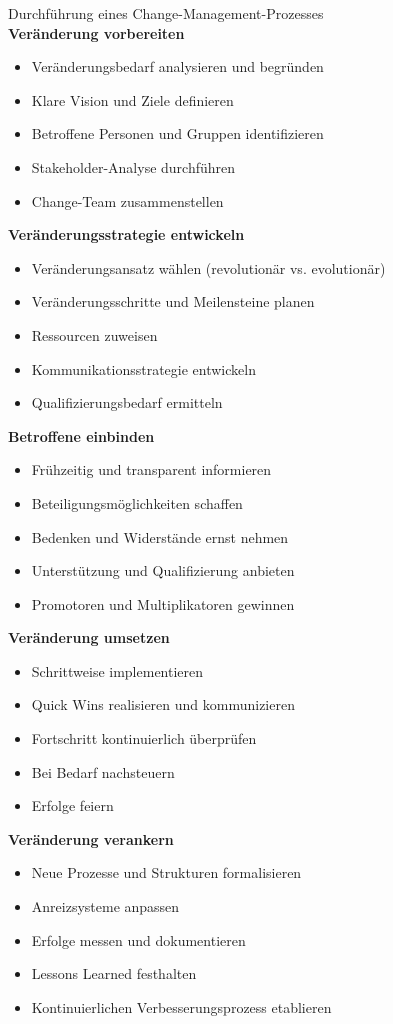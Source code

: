 \begin{KR}{Durchführung eines Change-Management-Prozesses}\\
\textbf{Veränderung vorbereiten}
\begin{itemize}
    \item Veränderungsbedarf analysieren und begründen
    \item Klare Vision und Ziele definieren
    \item Betroffene Personen und Gruppen identifizieren
    \item Stakeholder-Analyse durchführen
    \item Change-Team zusammenstellen
\end{itemize}

\textbf{Veränderungsstrategie entwickeln}
\begin{itemize}
    \item Veränderungsansatz wählen (revolutionär vs. evolutionär)
    \item Veränderungsschritte und Meilensteine planen
    \item Ressourcen zuweisen
    \item Kommunikationsstrategie entwickeln
    \item Qualifizierungsbedarf ermitteln
\end{itemize}

\textbf{Betroffene einbinden}
\begin{itemize}
    \item Frühzeitig und transparent informieren
    \item Beteiligungsmöglichkeiten schaffen
    \item Bedenken und Widerstände ernst nehmen
    \item Unterstützung und Qualifizierung anbieten
    \item Promotoren und Multiplikatoren gewinnen
\end{itemize}

\textbf{Veränderung umsetzen}
\begin{itemize}
    \item Schrittweise implementieren
    \item Quick Wins realisieren und kommunizieren
    \item Fortschritt kontinuierlich überprüfen
    \item Bei Bedarf nachsteuern
    \item Erfolge feiern
\end{itemize}

\textbf{Veränderung verankern}
\begin{itemize}
    \item Neue Prozesse und Strukturen formalisieren
    \item Anreizsysteme anpassen
    \item Erfolge messen und dokumentieren
    \item Lessons Learned festhalten
    \item Kontinuierlichen Verbesserungsprozess etablieren
\end{itemize}
\end{KR}


